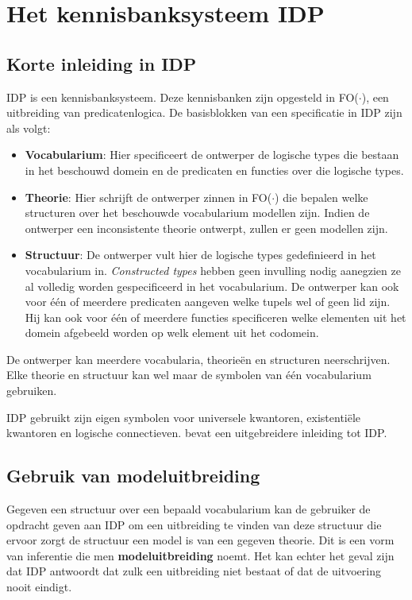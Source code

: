 \chapter{Het kennisbanksysteem IDP}\label{sec:rol-idp}
\section{Korte inleiding in IDP}
IDP is een kennisbanksysteem\cite{DeCatBroes2014PLaa}. Deze kennisbanken zijn opgesteld in FO($\cdot$), een uitbreiding van predicatenlogica. De basisblokken van een specificatie in IDP zijn als volgt:

\begin{itemize}
	\item \textbf{Vocabularium}: Hier specificeert de ontwerper de logische types die bestaan in het beschouwd domein en de predicaten en functies over die logische types.
	\item \textbf{Theorie}: Hier schrijft de ontwerper zinnen in FO($\cdot$) die bepalen welke structuren over het beschouwde vocabularium modellen zijn. Indien de ontwerper een inconsistente theorie ontwerpt, zullen er geen modellen zijn.
	\item \textbf{Structuur}: De ontwerper vult hier de logische types gedefinieerd in het vocabularium in. \textit{Constructed types} hebben geen invulling nodig aanegzien ze al volledig worden gespecificeerd in het vocabularium. De ontwerper kan ook voor \'e\'en of meerdere predicaten aangeven welke tupels wel of geen lid zijn. Hij kan ook voor \'e\'en of meerdere functies specificeren welke elementen uit het domein afgebeeld worden op welk element uit het codomein.
\end{itemize}

De ontwerper kan meerdere vocabularia, theorie\"en en structuren neerschrijven. Elke theorie en structuur kan wel maar de symbolen van \'e\'en vocabularium gebruiken.

IDP gebruikt zijn eigen symbolen voor universele kwantoren, existenti\"ele kwantoren en logische connectieven. \cite{DeCatBroes2014PLaa} bevat een uitgebreidere inleiding tot IDP.

\section{Gebruik van modeluitbreiding}
Gegeven een structuur over een bepaald vocabularium kan de gebruiker de opdracht geven aan IDP om een uitbreiding te vinden van deze structuur die ervoor zorgt de structuur een model is van een gegeven theorie. Dit is een vorm van inferentie die men \textbf{modeluitbreiding} noemt. Het kan echter het geval zijn dat IDP antwoordt dat zulk een uitbreiding niet bestaat of dat de uitvoering nooit eindigt.


